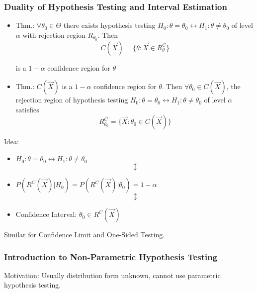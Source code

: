 \subsubsection{Duality of Hypothesis Testing and Interval Estimation}

\begin{itemize}
    \item Thm.: $\forall\theta_0\in\Theta$ there exists hypothesis testing $H_0:\theta=\theta_0\longleftrightarrow H_1:\theta\neq\theta_0$ of level $\alpha$ with rejection region $R_{\theta_0}$. Then
    \[
        C(\vec{X})=\{\theta:\vec{X}\in R^C_{\theta}\}
    \]

    is a $1-\alpha$ confidence region for $\theta$

    \item Thm.: $C(\vec{X})$ is a $1-\alpha$ confidence region for $\theta$. Then $\forall\theta_0\in C(\vec{X})$, the rejection region of hypothesis testing $H_0:\theta=\theta_0\longleftrightarrow H_1:\theta\neq\theta_0$ of level $\alpha$ satisfies
    \[
    R^C_{\theta_0}=\{\vec{X}:\theta_0\in C(\vec{X})\}
    \]
\end{itemize}
    
    \begin{point}
        Idea:
    \end{point}
    
        
\begin{itemize}[itemsep=-3pt]
    \item[] \centering $H_0:\theta=\theta_0\longleftrightarrow H_1:\theta\neq\theta_0$
    \[\updownarrow\]
    \item[] \centering $P(R^C(\vec{X})|H_0)=P(R^C(\vec{X})|\theta_0)=1-\alpha$
    \[\updownarrow\]
    \item[] Confidence Interval: $\theta_0\in R^C(\vec{X})$
\end{itemize}

    Similar for Confidence Limit and One-Sided Testing.

\subsubsection{Introduction to Non-Parametric Hypothesis Testing}\label{SubSectionNonIntroToParametricHypothesisTesting}

    Motivation: Usually distribution form unknown, cannot use parametric hypothesis testing.

